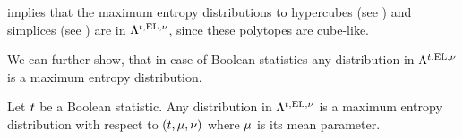 implies that the maximum entropy distributions to hypercubes (see ) and simplices (see ) are in $\Lambda^{t,\mathrm{EL},\nu}$, since these polytopes are cube-like.

We can further show, that in case of Boolean statistics any distribution in $\Lambda^{t,\mathrm{EL},\nu}$ is a maximum entropy distribution.


\begin{theorem}
    Let $t$ be a Boolean statistic.
    Any distribution in $\Lambda^{t,\mathrm{EL},\nu}$ is a maximum entropy distribution with respect to $(t,\mu,\nu)$ where $\mu$ is its mean parameter.
\end{theorem}
